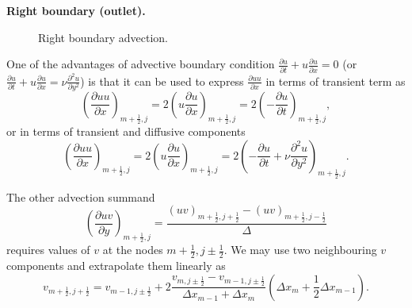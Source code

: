 \documentclass{article}
\begin{document}
\textbf{Right boundary (outlet).}
\begin{figure}[H] %
  \caption{Right boundary advection.}\label{fig:ADV-right}
\end{figure}
One of the advantages of advective boundary condition $\frac{\partial u}{\partial t}+u\frac{\partial u}{\partial x}=0$ (or  $\frac{\partial u}{\partial t}+u\frac{\partial u}{\partial x}=\nu \frac{\partial^2 u}{\partial y^2}$) is that it can be used to express $\frac{\partial uu}{\partial x}$ in terms of transient term as 
\begin{equation}
	\left( \frac{\partial uu}{\partial x}\right)_{m+\frac{1}{2},j}=2\left( u \frac{\partial u}{\partial x}\right)_{m+\frac{1}{2},j}=2\left( -\frac{\partial u}{\partial t}\right)_{m+\frac{1}{2},j},
\end{equation}
or in terms of transient and diffusive components
\begin{equation}
	\left( \frac{\partial uu}{\partial x}\right)_{m+\frac{1}{2},j}=2\left( u \frac{\partial u}{\partial x}\right)_{m+\frac{1}{2},j}=2\left( -\frac{\partial u}{\partial t}+\nu\frac{\partial ^2 u}{\partial y^2}\right)_{m+\frac{1}{2},j}.
\end{equation}

The other advection summand
\begin{equation}
	\left(\frac{\partial uv}{\partial y}\right)_{m+\frac{1}{2},j}=\frac{\left( uv \right)_{m+\frac{1}{2},j+\frac{1}{2}}-\left( uv\right)_{m+\frac{1}{2},j-\frac{1}{2}}}{\Delta}
\end{equation}
requires values of $v$ at the nodes $m+\frac{1}{2},j\pm \frac{1}{2}$. We may use two neighbouring $v$ components and extrapolate them linearly as 
\begin{equation}
	v_{m+\frac{1}{2},j+\frac{1}{2}}=v_{m-1,j\pm\frac{1}{2}}+2\frac{v_{m,j\pm\frac{1}{2}}-v_{m-1,j\pm\frac{1}{2}}}{\Delta x_{m-1}+\Delta x_m}\left(\Delta x_m + \frac{1}{2}\Delta x_{m-1}\right).
\end{equation}
\end{document}
